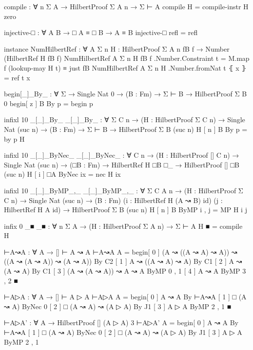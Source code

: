 \begin{spverbatim}
compile : ∀ {n Σ A} → HilbertProof Σ A n → Σ ⊢ A
compile H = compile-instr H zero

injective-□ : ∀ {A B} → □ A ≡ □ B → A ≡ B
injective-□ refl = refl

instance
  NumHilbertRef : ∀ {A Σ n} {H : HilbertProof Σ A n} {fB} {f} → Number (HilbertRef H fB f)
  NumHilbertRef {A} {Σ} {n} {H} {fB} {f} .Number.Constraint t = M.map f (lookup-may H t) ≡ just fB
  NumHilbertRef {A} {Σ} {n} {H} .Number.fromNat t ⦃ x ⦄ = ref t x

begin[_]_By_ : ∀ {Σ} → Single {Nat} 0 → (B : Fm) → Σ ⊢ B → HilbertProof Σ B 0
begin[ z ] B By p = begin p

infixl 10 _[_]_By_
_[_]_By_ : ∀ {Σ C n} → (H : HilbertProof Σ C n) → Single {Nat} (suc n) → (B : Fm) → Σ ⊢ B → HilbertProof Σ B (suc n)
H [ n ] B By p = by p H

infixl 10 _[_]_ByNec_
_[_]_ByNec_ : ∀ {C n}
  → (H : HilbertProof [] C n) → Single {Nat} (suc n)
  → (□B : Fm) → HilbertRef H □B □_
  → HilbertProof [] □B (suc n)
H [ i ] □A ByNec ix = nec H ix

infixl 10 _[_]_ByMP_,_
_[_]_ByMP_,_ : ∀ {Σ C A n} → (H : HilbertProof Σ C n) → Single {Nat} (suc n)
  → (B : Fm) (i : HilbertRef H (A ↝ B) id) (j : HilbertRef H A id) → HilbertProof Σ B (suc n)
H [ n ] B ByMP i , j = MP H i j

infix 0 _■
_■ : ∀ {n Σ A} → (H : HilbertProof Σ A n) → Σ ⊢ A
H ■ = compile H

⊢A↝A : ∀ {A} → [] ⊢ A ↝ A
⊢A↝A {A} =
  begin[ 0 ] (A ↝ ((A ↝ A) ↝ A)) ↝ ((A ↝ (A ↝ A)) ↝ (A ↝ A)) By C2
       [ 1 ] A ↝ ((A ↝ A) ↝ A)                                  By C1
       [ 2 ] A ↝ (A ↝ A)                                        By C1
       [ 3 ] (A ↝ (A ↝ A)) ↝ A ↝ A                             ByMP 0 , 1
       [ 4 ] A ↝ A                                               ByMP 3 , 2
       ■

⊢A▷A : ∀ {A} → [] ⊢ A ▷ A
⊢A▷A {A} =
  begin[ 0 ] A ↝ A                 By ⊢A↝A
       [ 1 ] □ (A ↝ A)             ByNec 0
       [ 2 ] □ (A ↝ A) ↝ (A ▷ A)  By J1
       [ 3 ] A ▷ A                 ByMP 2 , 1
       ■

⊢A▷A' : ∀ {A} → HilbertProof [] (A ▷ A) 3
⊢A▷A' {A} =
  begin[ 0 ] A ↝ A                 By ⊢A↝A
       [ 1 ] □ (A ↝ A)             ByNec 0
       [ 2 ] □ (A ↝ A) ↝ (A ▷ A)  By J1
       [ 3 ] A ▷ A                 ByMP 2 , 1
\end{spverbatim}
